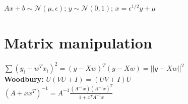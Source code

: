$Ax + b \sim \mathcal{N} (\mu, \epsilon)$; $y \sim \mathcal{N}(0,1)$; $x = \epsilon^{1/2} y + \mu$

\section{Matrix manipulation}

\begin{comment}
\textbf{$\nabla$(a$^T$w)} = $a$
\textbf{$\nabla$(w$^T$Bw)} = $2Bw$\\
\end{comment}
$\sum(y_i - w^T x_i)^2 = (y-Xw)^T(y-Xw) = ||y-Xw||^2$\\
\textbf{Woodbury:} $U(VU + I) = (UV+I)U$\\
 $(A + xx^T)^{-1} = A^{-1} \frac{(A^{-1}x)(A^{-1}x)^T}{1 + x^TA^{-1}x}$\\


